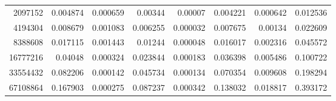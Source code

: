 \begin{tabular}{r r r r r r r r}
2097152 & 0.004874 & 0.000659 & 0.00344 & 0.00007 & 0.004221 & 0.000642 & 0.012536 \\
4194304 & 0.008679 & 0.001083 & 0.006255 & 0.000032 & 0.007675 & 0.00134 & 0.022609 \\
8388608 & 0.017115 & 0.001443 & 0.01244 & 0.000048 & 0.016017 & 0.002316 & 0.045572 \\
16777216 & 0.04048 & 0.000324 & 0.023844 & 0.000183 & 0.036398 & 0.005486 & 0.100722 \\
33554432 & 0.082206 & 0.000142 & 0.045734 & 0.000134 & 0.070354 & 0.009608 & 0.198294 \\
67108864 & 0.167903 & 0.000275 & 0.087237 & 0.000342 & 0.138032 & 0.018817 & 0.393172 \\
\end{tabular}